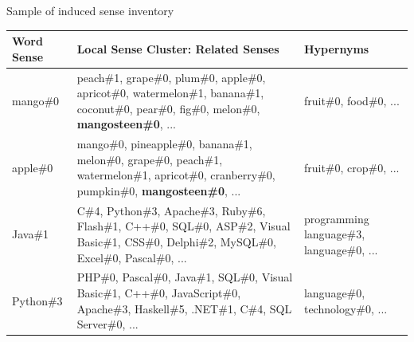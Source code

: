 	
\begin{frame}{Sample of induced \alert{sense inventory}}


\begin{table}
\centering
\scriptsize
\begin{tabular}{l|p{6cm}|p{2.5cm}} 
\bf Word Sense & \bf Local Sense Cluster: Related Senses & \bf Hypernyms \\
\toprule
 \alert{mango\#0} &  peach\#1, grape\#0, plum\#0, apple\#0, apricot\#0, watermelon\#1, banana\#1, coconut\#0, pear\#0, fig\#0, melon\#0,  \alert{\textbf{mangosteen\#0}}, ... & fruit\#0, food\#0, ... \\
 
\midrule
\alert{apple\#0} & mango\#0, pineapple\#0, banana\#1, melon\#0, grape\#0, peach\#1, watermelon\#1, apricot\#0, cranberry\#0, pumpkin\#0, \alert{\textbf{mangosteen\#0}}, ... & fruit\#0, crop\#0,  ... \\

\midrule
Java\#1 & C\#4, Python\#3, Apache\#3, Ruby\#6, Flash\#1, C++\#0, SQL\#0, ASP\#2, Visual Basic\#1, CSS\#0, Delphi\#2, MySQL\#0, Excel\#0, Pascal\#0, ... & programming language\#3, language\#0, ... \\

\midrule
Python\#3 & PHP\#0, Pascal\#0, Java\#1, SQL\#0, Visual Basic\#1, C++\#0, JavaScript\#0, Apache\#3, Haskell\#5, .NET\#1, C\#4, SQL Server\#0, ... & language\#0, technology\#0, ... \\

\end{tabular}


\end{table}



\end{frame}


